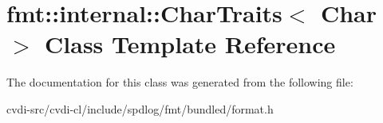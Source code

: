 \hypertarget{classfmt_1_1internal_1_1CharTraits}{}\section{fmt\+:\+:internal\+:\+:Char\+Traits$<$ Char $>$ Class Template Reference}
\label{classfmt_1_1internal_1_1CharTraits}


The documentation for this class was generated from the following file\+:\begin{DoxyCompactItemize}
\item 
cvdi-\/src/cvdi-\/cl/include/spdlog/fmt/bundled/format.\+h\end{DoxyCompactItemize}
